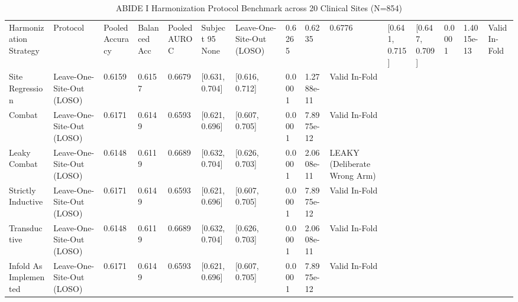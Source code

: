 \begin{table}
\caption{ABIDE I Harmonization Protocol Benchmark across 20 Clinical Sites (N=854)}
\label{tab:harmonization}
\begin{tabular}{llllllllll}
\toprule
Harmonization Strategy & Protocol & Pooled Accuracy & Balanced Acc & Pooled AUROC & Subject 95%
\midrule
None & Leave-One-Site-Out (LOSO) & 0.6265 & 0.6235 & 0.6776 & [0.641, 0.715] & [0.647, 0.709] & 0.0001 & 1.4015e-13 & Valid In-Fold \\
Site Regression & Leave-One-Site-Out (LOSO) & 0.6159 & 0.6157 & 0.6679 & [0.631, 0.704] & [0.616, 0.712] & 0.0001 & 1.2788e-11 & Valid In-Fold \\
Combat & Leave-One-Site-Out (LOSO) & 0.6171 & 0.6149 & 0.6593 & [0.621, 0.696] & [0.607, 0.705] & 0.0001 & 7.8975e-12 & Valid In-Fold \\
Leaky Combat & Leave-One-Site-Out (LOSO) & 0.6148 & 0.6119 & 0.6689 & [0.632, 0.704] & [0.626, 0.703] & 0.0001 & 2.0608e-11 & LEAKY (Deliberate Wrong Arm) \\
Strictly Inductive & Leave-One-Site-Out (LOSO) & 0.6171 & 0.6149 & 0.6593 & [0.621, 0.696] & [0.607, 0.705] & 0.0001 & 7.8975e-12 & Valid In-Fold \\
Transductive & Leave-One-Site-Out (LOSO) & 0.6148 & 0.6119 & 0.6689 & [0.632, 0.704] & [0.626, 0.703] & 0.0001 & 2.0608e-11 & Valid In-Fold \\
Infold As Implemented & Leave-One-Site-Out (LOSO) & 0.6171 & 0.6149 & 0.6593 & [0.621, 0.696] & [0.607, 0.705] & 0.0001 & 7.8975e-12 & Valid In-Fold \\
\bottomrule
\end{tabular}
\end{table}
